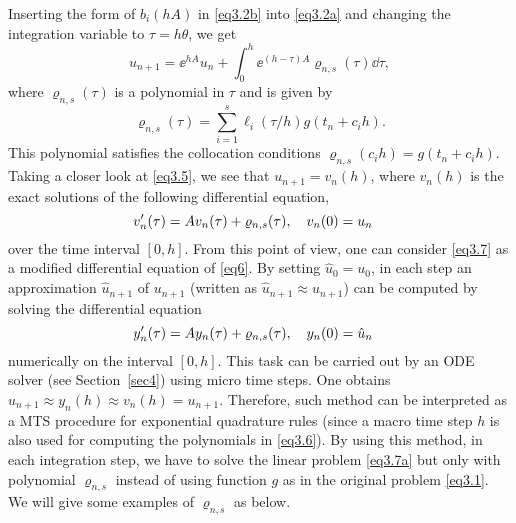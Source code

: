 Inserting the form of $b_i(hA)$ in \eqref{eq3.2b} into \eqref{eq3.2a} and changing the integration variable to $\tau=h\theta$, we get
\begin{equation} \label{eq3.5}
u_{n+1} = \ee^{h A}u_n + \int_{0}^{h} \ee^{(h-\tau)A} \varrho_{n,s}(\tau) \dd \tau, 
\end{equation}
where $\varrho_{n,s}(\tau)$ is a polynomial in $\tau$ and is given by
\begin{equation} \label{eq3.6}
\varrho_{n,s}(\tau)=\sum_{i=1}^{s}\ell_i(\tau/h) g(t_n +c_i h).
\end{equation}
This polynomial satisfies the collocation conditions $\varrho_{n,s}(c_i h)=g(t_n +c_i h)$.
Taking a closer look at \eqref{eq3.5}, we see that $u_{n+1}=v_n(h)$, where $v_n(h)$ is the exact solutions of the following differential equation, 
\begin{equation} \label{eq3.7}
v'_n(\tau)=Av_n(\tau) +  \varrho_{n,s}(\tau), \q  v_n(0)=u_n \q 
\end{equation}  
over the time interval $[0, h]$. From this point of view, one can consider \eqref{eq3.7} as a modified differential equation of \eqref{eq6}. By setting $\hat{u}_0=u_0$, in each step an approximation $\hat{u}_{n+1}$ of $u_{n+1}$ (written as $\hat{u}_{n+1}\approx u_{n+1}$) can be computed by solving the differential equation 
\begin{equation} \label{eq3.7a}
y'_n(\tau)=Ay_n(\tau) +  \varrho_{n,s}(\tau), \q  y_n(0)=\hat{u}_n \q 
\end{equation}
numerically on the interval $[0, h]$. This task can be carried out by  an ODE solver (see Section~\ref{sec4}) using micro time steps. One obtains $\hat{u}_{n+1}\approx y_n(h)\approx v_n(h)=u_{n+1}$. Therefore, such method can be interpreted as a MTS procedure for exponential quadrature rules (since a macro time step $h$ is also used for computing the polynomials in \eqref{eq3.6}). By using this method, in each integration step, we have to solve the linear problem \eqref{eq3.7a} but only with polynomial $\varrho_{n,s}$ instead of using function $g$ as in the original problem \eqref{eq3.1}. We will give some examples of $\varrho_{n,s}$ as below.
